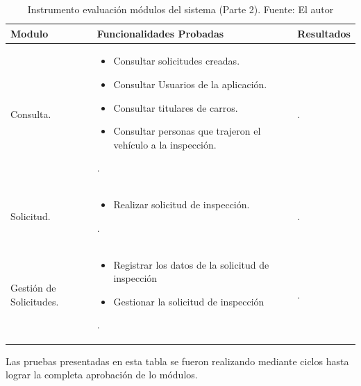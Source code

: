 \newpage

\begin{table}[H]	
\begin{center}
\begin{tabular}{ | m{4cm} | m{8cm}| m{3cm}| } 
 \hline
 Modulo & Funcionalidades Probadas & Resultados \\
 \hline
 

 Consulta. 
 & 
 \begin{itemize}
 	\item Consultar solicitudes creadas.
 	\item Consultar Usuarios de la aplicación.
 	\item Consultar titulares de carros.
 	\item Consultar personas que trajeron el vehículo a la inspección. 
 \end{itemize}. 
 & 
 .\\

  \hline
 Solicitud. 
 & 
 \begin{itemize}
 	\item Realizar solicitud de inspección.
 \end{itemize}. 
 & 
 .\\

 \hline
 Gestión de Solicitudes. 
 & 
 \begin{itemize}
 	\item Registrar los datos de la solicitud de inspección
 	\item Gestionar la solicitud de inspección
 \end{itemize}. 
 & 
 .\\

 \hline
\end{tabular}
\caption{Instrumento evaluación módulos del sistema (Parte 2). Fuente: El autor}
\label{Tabla:9}
\end{center}
\end{table}	

\setlength{\parskip}{5mm}

\newpage
Las pruebas presentadas en esta tabla se fueron realizando mediante ciclos hasta lograr la completa aprobación de lo módulos.

